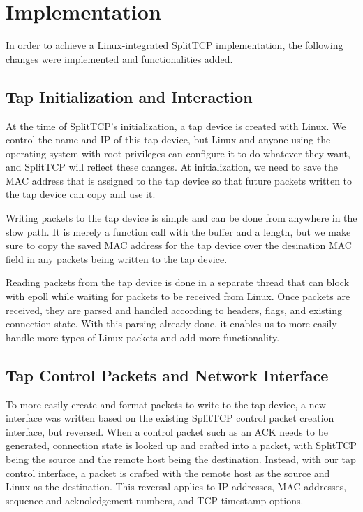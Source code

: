 \section{Implementation}

In order to achieve a Linux-integrated SplitTCP implementation, the following 
changes were implemented and functionalities added.

\subsection{Tap Initialization and Interaction}

At the time of SplitTCP's initialization, a tap device is created with Linux.
We control the name and IP of this tap device, but Linux and anyone using the
operating system with root privileges can configure it to do whatever they
want, and SplitTCP will reflect these changes. At initialization, we need to
save the MAC address that is assigned to the tap device so that future packets
written to the tap device can copy and use it. 

Writing packets to the tap device is simple and can be done from anywhere in the
slow path. It is merely a function call with the buffer and a length, but we 
make sure to copy the saved MAC address for the tap device over the desination
MAC field in any packets being written to the tap device. 

Reading packets from the tap device is done in a separate thread that can block
with epoll while waiting for packets to be received from Linux. Once packets are
received, they are parsed and handled according to headers, flags, and existing
connection state. With this parsing already done, it enables us to more easily
handle more types of Linux packets and add more functionality. 

\subsection{Tap Control Packets and Network Interface}

To more easily create and format packets to write to the tap device, a new
interface was written based on the existing SplitTCP control packet creation
interface, but reversed. When a control packet such as an ACK needs to be 
generated, connection state is looked up and crafted into a packet, with
SplitTCP being the source and the remote host being the destination. Instead,
with our tap control interface, a packet is crafted with the remote host as
the source and Linux as the destination. This reversal applies to IP addresses,
MAC addresses, sequence and acknoledgement numbers, and TCP timestamp options.

